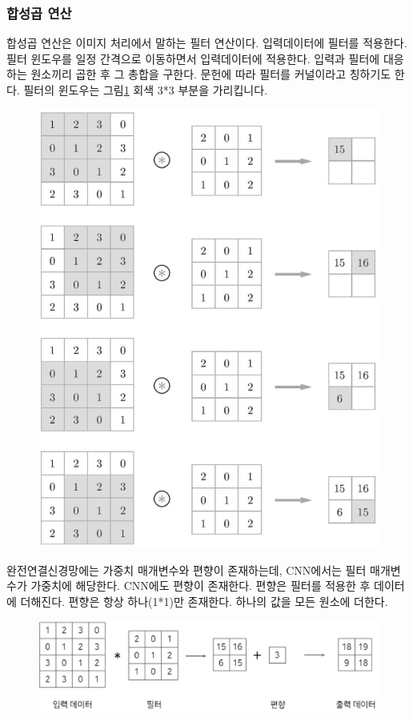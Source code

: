 \documentclass[11pt]{article}
\begin{document}
\subsubsection{합성곱 연산}
합성곱 연산은 이미지 처리에서 말하는 필터 연산이다. 입력데이터에 필터를 적용한다. 필터 윈도우를 일정 간격으로 이동하면서 입력데이터에 적용한다. 입력과 필터에 대응하는 원소끼리 곱한 후 그 총합을 구한다. 문헌에 따라 필터를 커널이라고 칭하기도 한다. 필터의 윈도우는 그림\ref{Fig.3} 회색 3*3 부분을 가리킵니다. 
\begin{figure}[h!]
    \includegraphics[width=1\columnwidth]{../Figure/Figure_3.pdf}
    \hlinefill
    \label{Fig.3}
\end{figure}
완전연결신경망에는 가중치 매개변수와 편향이 존재하는데, CNN에서는 필터 매개변수가 가중치에 해당한다. CNN에도 편향이 존재한다. 편향은 필터를 적용한 후 데이터에 더해진다. 편향은 항상 하나(1*1)만 존재한다. 하나의 값을 모든 원소에 더한다.
\begin{figure}[h!]
    \includegraphics[width=1\columnwidth]{../Figure/Figure_4.pdf}
    \label{Fig.4}
\end{figure} 
\end{document}
